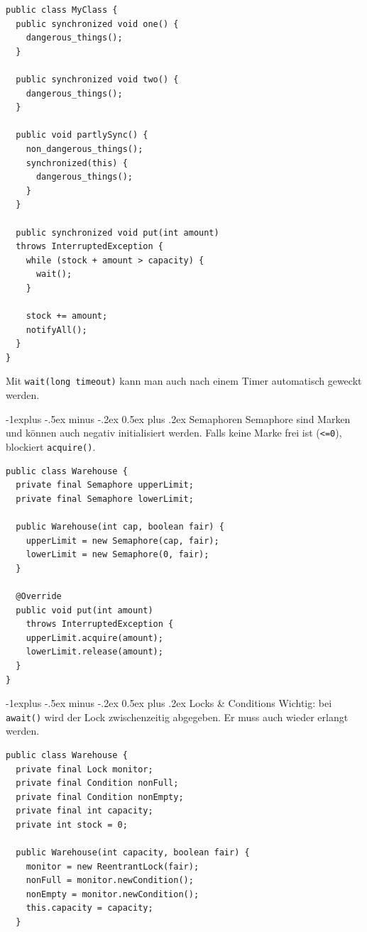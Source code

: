 \documentclass[a4paper, fontsize=6pt]{scrartcl}
\makeatletter
\renewcommand{\subsection}{\@startsection{subsection}{2}{0mm}%
    {-1explus -.5ex minus -.2ex}%
    {0.5ex plus .2ex}%
    {\normalfont\normalsize\bfseries}}
\makeatother
\begin{document}
\begin{multicols*}{5}
\begin{verbatim}
public class MyClass {
  public synchronized void one() {
    dangerous_things(); 
  }

  public synchronized void two() {
    dangerous_things();
  }

  public void partlySync() {
    non_dangerous_things();
    synchronized(this) {
      dangerous_things();
    }
  }

  public synchronized void put(int amount)
  throws InterruptedException {
    while (stock + amount > capacity) {
      wait();
    }

    stock += amount;
    notifyAll();
  }
}
\end{verbatim}

Mit \texttt{wait(long timeout)} kann man auch nach einem Timer automatisch geweckt werden.

\subsection{Semaphoren}
Semaphore sind Marken und können auch negativ initialisiert werden. Falls keine Marke frei ist (\texttt{<=0}), blockiert \texttt{acquire()}.

\begin{verbatim}
public class Warehouse {
  private final Semaphore upperLimit;
  private final Semaphore lowerLimit;

  public Warehouse(int cap, boolean fair) {
    upperLimit = new Semaphore(cap, fair);
    lowerLimit = new Semaphore(0, fair);
  }

  @Override
  public void put(int amount) 
    throws InterruptedException {
    upperLimit.acquire(amount);
    lowerLimit.release(amount);
  }
}
\end{verbatim}

\subsection{Locks \& Conditions}
Wichtig: bei \texttt{await()} wird der Lock zwischenzeitig abgegeben. Er muss auch wieder erlangt werden.

\begin{verbatim}
public class Warehouse {
  private final Lock monitor;
  private final Condition nonFull;
  private final Condition nonEmpty;
  private final int capacity;
  private int stock = 0;

  public Warehouse(int capacity, boolean fair) {
    monitor = new ReentrantLock(fair);
    nonFull = monitor.newCondition();
    nonEmpty = monitor.newCondition();
    this.capacity = capacity;
  }


\end{verbatim}
\end{multicols*}
\end{document}

